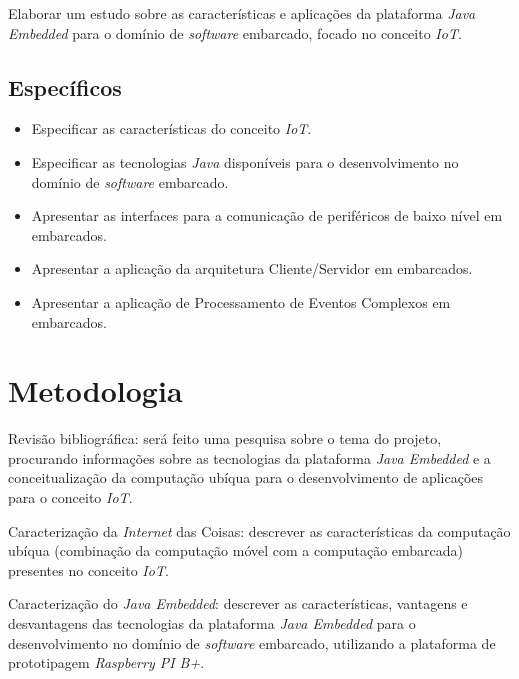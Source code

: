 Elaborar um estudo sobre as características e aplicações da plataforma
\textit{Java Embedded} para o domínio de \textit{software} embarcado, focado no
conceito \textit{IoT}.

\subsection{Específicos}

\begin{itemize}

    \item Especificar as características do conceito \textit{IoT}.

    \item Especificar as tecnologias \textit{Java} disponíveis para o
      desenvolvimento no domínio de \textit{software} embarcado.

    \item Apresentar as interfaces para a comunicação de periféricos de baixo
    nível em embarcados.

    \item Apresentar a aplicação da arquitetura Cliente/Servidor em
    embarcados.

    \item Apresentar a aplicação de Processamento de Eventos Complexos em
    embarcados.

\end{itemize}

\section{Metodologia}

Revisão bibliográfica: será feito uma pesquisa sobre o tema do projeto,
procurando informações sobre as tecnologias da plataforma \textit{Java
  Embedded} e a conceitualização da computação ubíqua para o desenvolvimento de
aplicações para o conceito \textit{IoT}.

Caracterização da \textit{Internet} das Coisas: descrever as características da
computação ubíqua (combinação da computação móvel com a computação embarcada)
presentes no conceito \textit{IoT}.

Caracterização do \textit{Java Embedded}: descrever as características,
vantagens e desvantagens das tecnologias da plataforma \textit{Java Embedded}
para o desenvolvimento no domínio de \textit{software} embarcado, utilizando a
plataforma de prototipagem \textit{Raspberry PI B+}.

